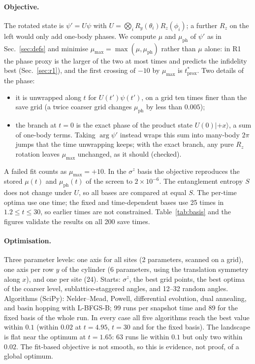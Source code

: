 \documentclass[11pt,a4paper]{article}
\newcommand{\tprox}{t^*_{\mathrm{prox}}}
\begin{document}
\paragraph{Objective.} The rotated state is $\psi'=U\psi$ with $U=\bigotimes_iR_y(\theta_i)R_z(\phi_i)$; a further
$R_z$ on the left would only add one-body phases. We compute $\mu$ and $\mu_{\mathrm{ph}}$ of $\psi'$ as in
Sec.~\ref{sec:defs} and minimise $\mu_{\max}=\max(\mu,\mu_{\mathrm{ph}})$ rather than $\mu$ alone: in R1 the phase proxy
is the larger of the two at most times and predicts the infidelity best (Sec.~\ref{sec:r1}), and the first crossing of
$-10$ by $\mu_{\max}$ is $\tprox$. Two details of the phase:
\begin{itemize}
  \item it is unwrapped along $t$ for $U(t')\psi(t')$, on a grid ten times finer than the save grid (a twice coarser
    grid changes $\mu_{\mathrm{ph}}$ by less than $0.005$);
  \item the branch at $t=0$ is the exact phase of the product state $U(0)|{+}x\rangle$, a sum of one-body terms. Taking
    $\arg\psi'$ instead wraps this sum into many-body $2\pi$ jumps that the time unwrapping keeps; with the exact branch,
    any pure $R_z$ rotation leaves $\mu_{\max}$ unchanged, as it should (checked).
\end{itemize}
A failed fit counts as $\mu_{\max}=+10$. In the $\sigma^z$ basis the objective reproduces the stored $\mu(t)$ and
$\mu_{\mathrm{ph}}(t)$ of the screen to $2\times10^{-6}$. The entanglement entropy $S$ does not change under $U$, so all
bases are compared at equal $S$. The per-time optima use one time; the fixed and time-dependent bases use 25 times in
$1.2\le t\le30$, so earlier times are not constrained. Table~\ref{tab:basis} and the figures validate the results on all
200 save times.

\paragraph{Optimisation.} Three parameter levels: one axis for all sites (2 parameters, scanned on a grid), one axis per
row $y$ of the cylinder (6 parameters, using the translation symmetry along $x$), and one per site (24). Starts:
$\sigma^z$, the best grid points, the best optima of the coarser level, sublattice-staggered angles, and 12--32 random
angles. Algorithms (SciPy): Nelder--Mead, Powell, differential evolution, dual annealing, and basin hopping with
L-BFGS-B; 99 runs per snapshot time and 89 for the fixed basis of the whole run. In every case all five algorithms
reach the best value within $0.1$ (within $0.02$ at $t=4.95$, $t=30$ and for the fixed basis). The landscape is flat
near the optimum at $t=1.65$: 63 runs lie within $0.1$ but only two within $0.02$. The fit-based objective is not
smooth, so this is evidence, not proof, of a global optimum.
\end{document}
